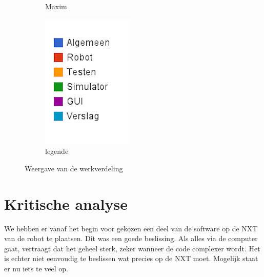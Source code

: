 \documentclass[t1]{penoverslag}
\begin{document}
\begin{figure}
\begin{subfigure}[hb]{0.15\textwidth}
                \caption{Maxim}
        \end{subfigure}%
        \begin{subfigure}[hb]{0.11\textwidth}
                \centering
                \includegraphics[width=\textwidth]{werk_legende}
                \caption{legende}
        \end{subfigure}
 \caption{Weergave van de werkverdeling}
\label{fig:werkverdeling}
\end{figure}

\section{Kritische analyse}
\label{Assec:kritischeAnalyse}
We hebben er vanaf het begin voor gekozen een deel van de software op de NXT van de robot te plaatsen. Dit was een goede beslissing. Als alles via de computer gaat, vertraagt dat het geheel sterk, zeker wanneer de code complexer wordt. Het is echter niet eenvoudig te beslissen wat precies op de NXT moet. Mogelijk staat er nu iets te veel op.\\
\end{document}
